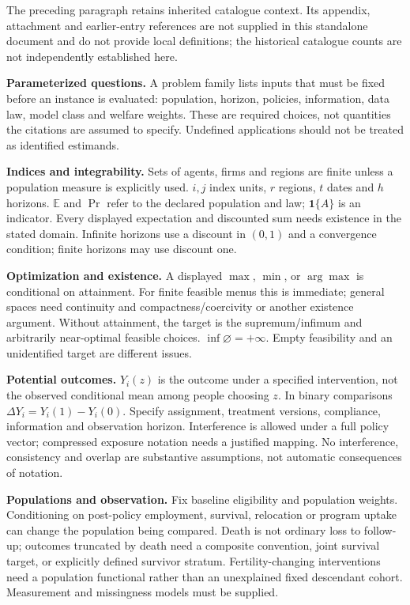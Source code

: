 \documentclass[11pt,a4paper]{article}
\begin{document}
The preceding paragraph retains inherited catalogue context. Its appendix, attachment and earlier-entry references are not supplied in this standalone document and do not provide local definitions; the historical catalogue counts are not independently established here.

\textbf{Parameterized questions.} A problem family lists inputs that must be fixed before an instance is evaluated: population, horizon, policies, information, data law, model class and welfare weights. These are required choices, not quantities the citations are assumed to specify. Undefined applications should not be treated as identified estimands.

\textbf{Indices and integrability.} Sets of agents, firms and regions are finite unless a population measure is explicitly used. \(i,j\) index units, \(r\) regions, \(t\) dates and \(h\) horizons. \(\mathbb E\) and \(\Pr\) refer to the declared population and law; \(\mathbf1\{A\}\) is an indicator. Every displayed expectation and discounted sum needs existence in the stated domain. Infinite horizons use a discount in \((0,1)\) and a convergence condition; finite horizons may use discount one.

\textbf{Optimization and existence.} A displayed \(\max\), \(\min\), or \(\arg\max\) is conditional on attainment. For finite feasible menus this is immediate; general spaces need continuity and compactness/coercivity or another existence argument. Without attainment, the target is the supremum/infimum and arbitrarily near-optimal feasible choices. \(\inf\varnothing=+\infty\). Empty feasibility and an unidentified target are different issues.

\textbf{Potential outcomes.} \(Y_i(z)\) is the outcome under a specified intervention, not the observed conditional mean among people choosing \(z\). In binary comparisons \(\Delta Y_i=Y_i(1)-Y_i(0)\). Specify assignment, treatment versions, compliance, information and observation horizon. Interference is allowed under a full policy vector; compressed exposure notation needs a justified mapping. No interference, consistency and overlap are substantive assumptions, not automatic consequences of notation.

\textbf{Populations and observation.} Fix baseline eligibility and population weights. Conditioning on post-policy employment, survival, relocation or program uptake can change the population being compared. Death is not ordinary loss to follow-up; outcomes truncated by death need a composite convention, joint survival target, or explicitly defined survivor stratum. Fertility-changing interventions need a population functional rather than an unexplained fixed descendant cohort. Measurement and missingness models must be supplied.
\end{document}

